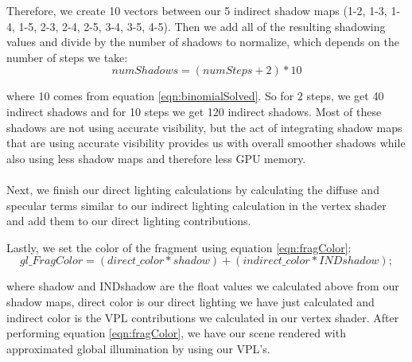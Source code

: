 Therefore, we create 10 vectors between our 5 indirect shadow maps (1-2, 1-3, 1-4, 1-5, 2-3, 2-4, 2-5, 3-4, 3-5, 4-5).  Then we add all of the resulting shadowing values and divide by the number of shadows to normalize, which depends on the number of steps we take:
\begin{equation}
numShadows = (numSteps+2)*10\label{eqn:numIndShadows}
\end{equation}

where 10 comes from equation \ref{eqn:binomialSolved}.  So for 2 steps, we get 40 indirect shadows and for 10 steps we get 120 indirect shadows.  Most of these shadows are not using accurate visibility, but the act of integrating shadow maps that are using accurate visibility provides us with overall smoother shadows while also using less shadow maps and therefore less GPU memory.

\paragraph{}
Next, we finish our direct lighting calculations by calculating the diffuse and specular terms similar to our indirect lighting calculation in the vertex shader and add them to our direct lighting contributions.

Lastly, we set the color of the fragment using equation \ref{eqn:fragColor}:
\begin{equation}
gl\_FragColor = (direct\_color*shadow) + (indirect\_color*INDshadow); \label{eqn:fragColor}
\end{equation}

where shadow and INDshadow are the float values we calculated above from our shadow maps, direct color is our direct lighting we have just calculated and indirect color is the VPL contributions we calculated in our vertex shader.  After performing equation \ref{eqn:fragColor}, we have our scene rendered with approximated global illumination by using our VPL's.
